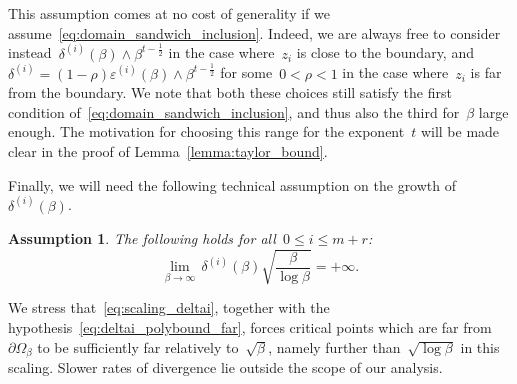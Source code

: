 \documentclass[10pt]{article}
\newcommand{\1}{\mathbbm 1}
\newcommand{\epsBoundary}[1]{\varepsilon^{(#1)}} %
\newcommand{\deltaRadius}[1]{\delta^{(#1)}} %
\newcommand{\scalingExp}{t}
\newcommand{\shift}{\rho} %
\newtheorem{hypothesis}{Assumption}
\begin{document}
    This assumption comes at no cost of generality if we assume~\eqref{eq:domain_sandwich_inclusion}. Indeed, we are always free to consider instead~$\deltaRadius{i}(\beta) \land \beta^{\scalingExp-\frac12}$ in the case where~$z_i$ is close to the boundary, and~$\deltaRadius{i} = (1-\shift)\epsBoundary{i}(\beta)\land\beta^{\scalingExp-\frac12}$ for some~$0<\shift<1$ in the case where~$z_i$ is far from the boundary.
    We note that both these choices still satisfy the first condition of~\eqref{eq:domain_sandwich_inclusion}, and thus also the third for~$\beta$ large enough.
    The motivation for choosing this range for the exponent~$\scalingExp$ will be made clear in the proof of Lemma~\ref{lemma:taylor_bound}.

    Finally, we will need the following technical assumption on the growth of~$\deltaRadius{i}(\beta)$.
    \begin{hypothesis}
        The following holds for all~$0\leq i\leq m+r$:
        \begin{equation}
            \tag{\bf H3}
            \label{eq:scaling_deltai}
            \underset{\beta\to\infty}{\lim}\, \deltaRadius{i}(\beta)\sqrt{\frac{\beta}{\log\beta}}= +\infty.
        \end{equation}
    \end{hypothesis}
    We stress that~\eqref{eq:scaling_deltai}, together with the hypothesis~\eqref{eq:deltai_polybound_far}, forces critical points which are far from~$\partial \Omega_\beta$ to be sufficiently far relatively to~$\sqrt\beta$, namely further than~$\sqrt{\log \beta}$ in this scaling. Slower rates of divergence lie outside the scope of our analysis.
    
\end{document}
